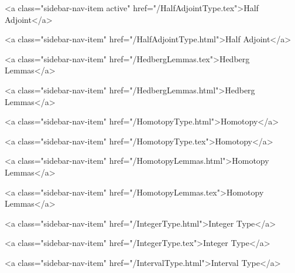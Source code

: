       
        
          <a class="sidebar-nav-item active" href="/HalfAdjointType.tex">Half Adjoint</a>
        
      
    
      
        
          <a class="sidebar-nav-item" href="/HalfAdjointType.html">Half Adjoint</a>
        
      
    
      
        
          <a class="sidebar-nav-item" href="/HedbergLemmas.tex">Hedberg Lemmas</a>
        
      
    
      
        
          <a class="sidebar-nav-item" href="/HedbergLemmas.html">Hedberg Lemmas</a>
        
      
    
      
        
          <a class="sidebar-nav-item" href="/HomotopyType.html">Homotopy</a>
        
      
    
      
        
          <a class="sidebar-nav-item" href="/HomotopyType.tex">Homotopy</a>
        
      
    
      
        
          <a class="sidebar-nav-item" href="/HomotopyLemmas.html">Homotopy Lemmas</a>
        
      
    
      
        
          <a class="sidebar-nav-item" href="/HomotopyLemmas.tex">Homotopy Lemmas</a>
        
      
    
      
        
          <a class="sidebar-nav-item" href="/IntegerType.html">Integer Type</a>
        
      
    
      
        
          <a class="sidebar-nav-item" href="/IntegerType.tex">Integer Type</a>
        
      
    
      
        
          <a class="sidebar-nav-item" href="/IntervalType.html">Interval Type</a>
        
      
    
